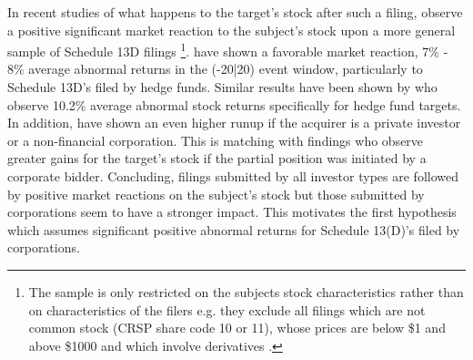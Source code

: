 \documentclass[12pt]{article}
\begin{document}
In recent studies of what happens to the target's stock after such a filing, \citet{Collin-Dufresne2015} observe a positive significant market reaction to the subject's stock upon a more general sample of Schedule 13D filings 
	\footnote{The sample is only restricted on the subjects stock characteristics rather than on characteristics of the filers e.g. they exclude all filings which are not common stock (CRSP share code 10 or 11), whose prices are below \$1 and above \$1000 and which involve derivatives \citep{Collin-Dufresne2015}.}. 
\citet{Brav2008} have shown a favorable market reaction, 7\% - 8\% average abnormal returns in the (-20|20) event window, particularly to Schedule 13D's filed by hedge funds. Similar results have been shown by \citet{Klein2009} who observe 10.2\% average abnormal stock returns specifically for hedge fund targets.\\
In addition, \citet{Brigida2012} have shown an even higher runup if the acquirer is a private investor or a non-financial corporation. This is matching with \citet{Akhigbe2007} findings who observe greater gains for the target's stock if the partial position was initiated by a corporate bidder. Concluding, filings submitted by all investor types are followed by positive market reactions on the subject's stock but those submitted by corporations seem to have a stronger impact. This motivates the first hypothesis which assumes significant positive abnormal returns for Schedule 13(D)'s filed by corporations.
\end{document}

